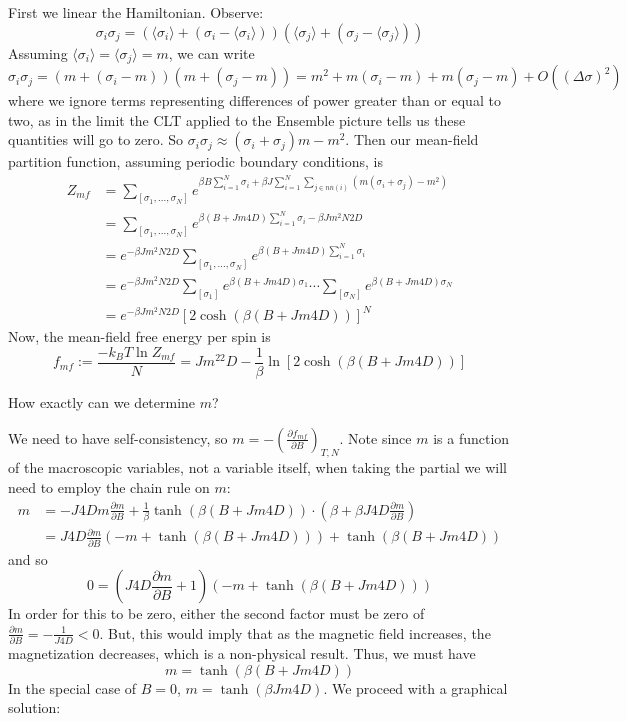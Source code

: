 \documentclass[12pt, a4paper, oneside, openright, titlepage]{book}
\begin{document}
First we linear the Hamiltonian. Observe: $$\sigma_i\sigma_j = (\langle \sigma_i\rangle + (\sigma_i - \langle \sigma_i\rangle))(\langle \sigma_j\rangle + (\sigma_j-\langle \sigma_j\rangle))$$
Assuming $\langle \sigma_i \rangle = \langle \sigma_j\rangle = m$, we can write $$\sigma_i\sigma_j = (m+(\sigma_i-m))(m+(\sigma_j-m)) = m^2 + m(\sigma_i-m)+m(\sigma_j-m) + O((\Delta \sigma)^2)$$
where we ignore terms representing differences of power greater than or equal to two, as in the limit the CLT applied to the Ensemble picture tells us these quantities will go to zero. So $\sigma_i\sigma_j \approx (\sigma_i+\sigma_j)m - m^2$. Then our mean-field partition function, assuming periodic boundary conditions, is \begin{align*}
    Z_{mf} &= \sum_{[\sigma_1,...,\sigma_N]}e^{\beta B\sum_{i=1}^N\sigma_i + \beta J\sum_{i=1}^N\sum_{j\in nn(i)}(m(\sigma_i+\sigma_j)-m^2)} \\
    &= \sum_{[\sigma_1,...,\sigma_N]}e^{\beta(B+Jm4D)\sum_{i=1}^N\sigma_i - \beta Jm^2N2D} \\
    &= e^{-\beta Jm^2N2D}\sum_{[\sigma_1,...,\sigma_N]}e^{\beta(B+Jm4D)\sum_{i=1}^N\sigma_i} \\
    &= e^{-\beta Jm^2N2D}\sum_{[\sigma_1]}e^{\beta(B+Jm4D)\sigma_1}\cdots \sum_{[\sigma_N]}e^{\beta(B+Jm4D)\sigma_N} \\
    &=e^{-\beta Jm^2N2D}[2\cosh(\beta(B+Jm4D))]^N 
\end{align*}
Now, the mean-field free energy per spin is $$f_{mf} := \frac{-k_BT\ln Z_{mf}}{N} = Jm^22D - \frac{1}{\beta}\ln[2\cosh(\beta(B+Jm4D))]$$
\begin{qst}
    How exactly can we determine $m$?
\end{qst}

We need to have self-consistency, so $m = -\left(\frac{\partial f_{mf}}{\partial B}\right)_{T,N}$. Note since $m$ is a function of the macroscopic variables, not a variable itself, when taking the partial we will need to employ the chain rule on $m$: \begin{align*}
    m &= -J4Dm\frac{\partial m}{\partial B} + \frac{1}{\beta}\tanh(\beta(B+Jm4D))\cdot(\beta+\beta J4D\frac{\partial m}{\partial B}) \\
    &= J4D\frac{\partial m}{\partial B}(-m+\tanh(\beta(B+Jm4D))) + \tanh(\beta(B+Jm4D))
\end{align*}
and so $$0 = (J4D\frac{\partial m}{\partial B} + 1)(-m+\tanh(\beta(B+Jm4D)))$$
In order for this to be zero, either the second factor must be zero of $\frac{\partial m}{\partial B} = -\frac{1}{J4D} < 0$. But, this would imply that as the magnetic field increases, the magnetization decreases, which is a non-physical result. Thus, we must have $$m = \tanh(\beta(B+Jm4D))$$
In the special case of $B = 0$, $m = \tanh(\beta Jm4D)$. We proceed with a graphical solution:
\end{document}
